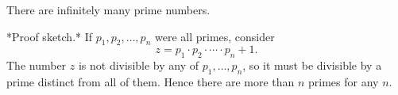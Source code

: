 There are infinitely many prime numbers.

*Proof sketch.* If $p_1, p_2, \ldots, p_n$ were all primes, consider
$$z = p_1 \cdot p_2 \cdot \cdots \cdot p_n + 1.$$
The number $z$ is not divisible by any of $p_1, \ldots, p_n$, so it must be divisible by a prime distinct from all of them. Hence there are more than $n$ primes for any $n$.
